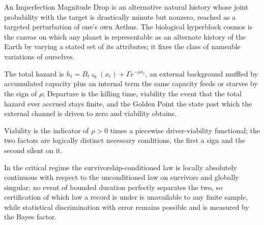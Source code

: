 \begin{definition}
\label{imp:imd}
An Imperfection Magnitude Drop is an alternative natural history whose
joint probability with the target is drastically minute but nonzero,
reached as a targeted perturbation of one's own Aethus. The biological
hyperblock cosmos is the canvas on which any planet is representable as
an alternate history of the Earth by varying a stated set of its
attributes; it fixes the class of nameable variations of ourselves.
\end{definition}

\begin{definition}
\label{imp:goldenpoint}
The total hazard is $h_t=B_t\varsigma_b(x_t)+\Gamma e^{-\rho x_t}$, an
external background muffled by accumulated capacity plus an internal term
the same capacity feeds or starves by the sign of $\rho$; Departure is the
killing time, viability the event that the total hazard ever accrued stays
finite, and the Golden Point the state past which the external channel is
driven to zero and viability obtains.
\end{definition}

\begin{theorem}
\label{imp:twocond}
Viability is the indicator of $\rho>0$ times a piecewise driver-viability
functional; the two factors are logically distinct necessary conditions,
the first a sign and the second silent on it.
\end{theorem}

\begin{theorem}
\label{imp:ceiling}
In the critical regime the survivorship-conditioned law is locally
absolutely continuous with respect to the unconditioned law on survivors
and globally singular; no event of bounded duration perfectly separates
the two, so certification of which law a record is under is unavailable
to any finite sample, while statistical discrimination with error remains
possible and is measured by the Bayes factor.
\end{theorem}


